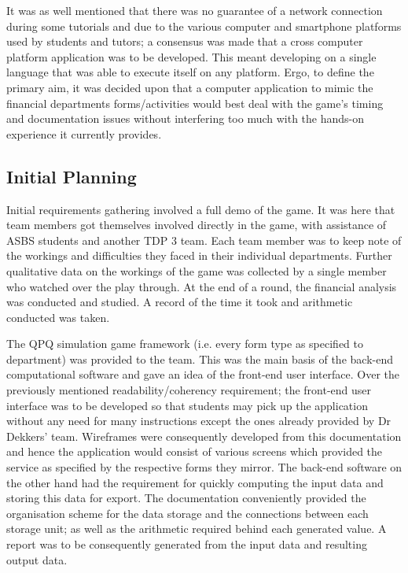 \documentclass{l3proj}
\begin{document}
It was as well mentioned that there was no guarantee of a network connection during some tutorials and due to the various computer and smartphone platforms used by students and tutors; a consensus was made that a cross computer platform application was to be developed. This meant developing on a single language that was able to execute itself on any platform.
Ergo, to define the primary aim, it was decided upon that a computer application to mimic the financial departments forms/activities would best deal with the game's timing and documentation issues without interfering too much with the hands-on experience it currently provides.


\subsection{Initial Planning}
Initial requirements gathering involved a full demo of the game. It was here that team members got themselves involved directly in the game, with assistance of ASBS students and another TDP 3 team. Each team member was to keep note of the workings and difficulties they faced in their individual departments. Further qualitative data on the workings of the game was collected by a single member who watched over the play through. At the end of a round, the financial analysis was conducted and studied. A record of the time it took and arithmetic conducted was taken.

The QPQ simulation game framework (i.e. every form type as specified to department) was provided to the team. This was the main basis of the back-end computational software and gave an idea of the front-end user interface. Over the previously mentioned readability/coherency requirement; the front-end user interface was to be developed so that students may pick up the application without any need for many instructions except the ones already provided by Dr Dekkers' team. Wireframes were consequently developed from this documentation and hence the application would consist of various screens which provided the service as specified by the respective forms they mirror. The back-end software on the other hand had the requirement for quickly computing the input data and storing this data for export. The documentation conveniently provided the organisation scheme for the data storage and the connections between each storage unit; as well as the arithmetic required behind each generated value. A report was to be consequently generated from the input data and resulting output data.
    
\end{document}
